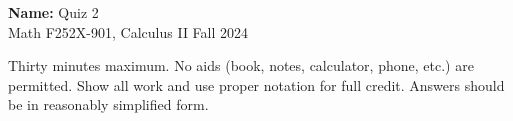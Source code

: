 \documentclass[12pt]{article}
\begin{document}
\pagestyle{plain}

\noindent \textbf{Name:} \underline{\hspace{15em}}		\hfill	Quiz 2 \\
           Math F252X-901, Calculus II  			\hfill	Fall 2024 	

                \vspace{1cm}
                
Thirty minutes maximum. No aids (book, notes,
calculator, phone, etc.) are permitted. Show all work and use proper
notation for full credit. Answers should be in reasonably simplified
form.
\end{document}
